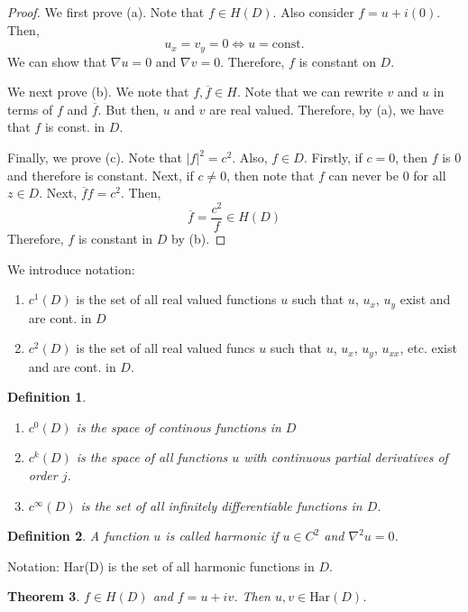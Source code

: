\documentclass{article}
\newtheorem{theorem}{Theorem}[section]
\newtheorem{definition}[theorem]{Definition}
\newtheorem{one minute paper}[theorem]{One Minute Paper}
\begin{document}
\begin{proof}
    We first prove (a). Note that $f \in H(D)$. Also consider $f = u + i(0)$. Then, 
    \begin{equation}
        u_x = v_y = 0 \iff u = \text{const.}
    \end{equation}
    We can show that $\nabla u = 0$ and $\nabla v = 0$. Therefore, $f$ is constant on $D$.
    
    We next prove (b). We note that $f, \overline{f} \in H$. Note that we can rewrite $v$ and $u$ in terms of $f$ and $\overline{f}$. But then, $u$ and $v$ 
    are real valued. Therefore, by (a), we have that $f$ is const. in $D$.

    Finally, we prove (c). Note that $|f|^2 = c^2$. Also, $f \in D$. Firstly, if $c = 0$, then $f$ is 0 and therefore is constant. 
    Next, if $c \neq 0$, then note that $f$ can never be $0$ for all $z \in D$. Next, $\overline{f}f = c^2$. Then, 
    \begin{equation}
        \overline{f} = \frac{c^2}{f} \in H(D)
    \end{equation}
    Therefore, $f$ is constant in $D$ by (b). 
\end{proof}

We introduce notation: 
\begin{enumerate}
    \item $c^1(D)$ is the set of all real valued functions $u$ such that $u$, $u_x$, $u_y$ exist and are cont. in $D$
    \item $c^2(D)$ is the set of all real valued funcs $u$ such that $u$, $u_x$, $u_y$, $u_{xx}$, etc. exist and are cont. in $D$. 
\end{enumerate}

\begin{definition}
    \begin{enumerate}
        \item $c^0(D)$ is the space of continous functions in $D$
        \item $c^k(D)$ is the space of all functions $u$ with continuous partial derivatives of order $j$. 
        \item $c^{\infty}(D)$ is the set of all infinitely differentiable functions in $D$. 
    \end{enumerate}
\end{definition}

\begin{definition}
    A function $u$ is called harmonic if $u \in C^2$ and $\nabla^2 u = 0$. 
\end{definition}

Notation: Har(D) is the set of all harmonic functions in $D$. 

\begin{theorem}
    $f \in H(D)$ and $f = u + iv$. Then $u,v \in \text{Har}(D)$. 
\end{theorem}
\end{document}
